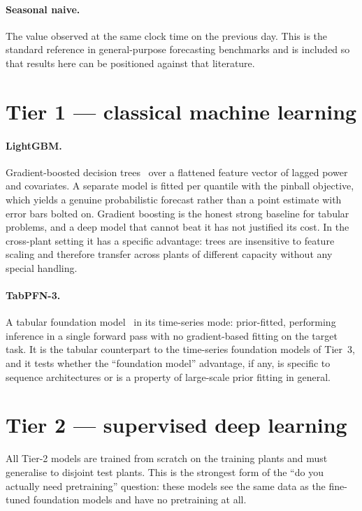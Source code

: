 \paragraph{Seasonal naive.} The value observed at the same clock time on the previous day.
This is the standard reference in general-purpose forecasting benchmarks and is included so
that results here can be positioned against that literature.

\section{Tier 1 --- classical machine learning}
\label{sec:tier1}

\paragraph{LightGBM.} Gradient-boosted decision trees~\cite{lightgbm} over a flattened
feature vector of lagged power and covariates. A separate model is fitted per quantile with
the pinball objective, which yields a genuine probabilistic forecast rather than a point
estimate with error bars bolted on. Gradient boosting is the honest strong baseline for
tabular problems, and a deep model that cannot beat it has not justified its cost. In the
cross-plant setting it has a specific advantage: trees are insensitive to feature scaling
and therefore transfer across plants of different capacity without any special handling.

\paragraph{TabPFN-3.} A tabular foundation model~\cite{tabpfn3} in its time-series mode:
prior-fitted, performing inference in a single forward pass with no gradient-based fitting
on the target task. It is the tabular counterpart to the time-series foundation models of
Tier~3, and it tests whether the ``foundation model'' advantage, if any, is specific to
sequence architectures or is a property of large-scale prior fitting in general.

\section{Tier 2 --- supervised deep learning}
\label{sec:tier2}

All Tier-2 models are trained from scratch on the training plants and must generalise to
disjoint test plants. This is the strongest form of the ``do you actually need pretraining''
question: these models see the same data as the fine-tuned foundation models and have no
pretraining at all.


